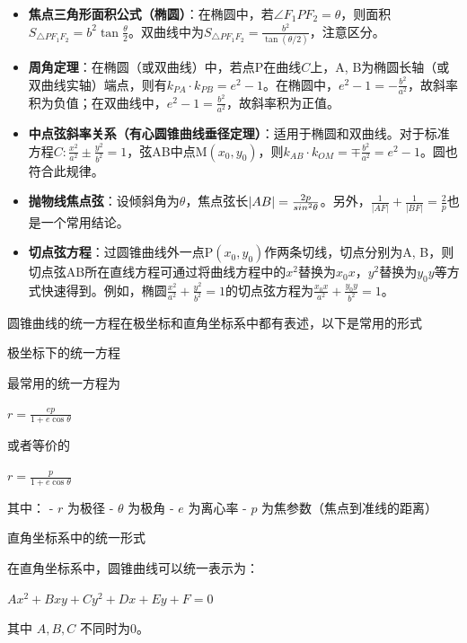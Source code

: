 \documentclass{article}
\begin{document}
	\begin{itemize}
		\item \textbf{焦点三角形面积公式（椭圆）}：在椭圆中，若$\angle F_1PF_2 = \theta$，则面积$S_{\triangle PF_1F_2} = b^2 \tan \frac{\theta}{2}$。双曲线中为$S_{\triangle PF_1F_2} = \frac{b^2}{\tan(\theta/2)}$，注意区分。
		
		\item \textbf{周角定理}：在椭圆（或双曲线）中，若点P在曲线$C$上，A, B为椭圆长轴（或双曲线实轴）端点，则有$k_{PA} \cdot k_{PB} = e^2 - 1$。在椭圆中，$e^2 - 1 = -\frac{b^2}{a^2}$，故斜率积为负值；在双曲线中，$e^2 - 1 = \frac{b^2}{a^2}$，故斜率积为正值。
		
		\item \textbf{中点弦斜率关系（有心圆锥曲线垂径定理）}：适用于椭圆和双曲线。对于标准方程$C: \frac{x^2}{a^2} \pm \frac{y^2}{b^2} = 1$，弦AB中点M$(x_0, y_0)$，则$k_{AB} \cdot k_{OM} = \mp \frac{b^2}{a^2} = e^2 - 1$。圆也符合此规律。
		
		\item \textbf{抛物线焦点弦}：设倾斜角为$\theta$，焦点弦长$|AB| = \frac{2p}{\\sin^2 \theta}$。另外，$\frac{1}{|AF|} + \frac{1}{|BF|} = \frac{2}{p}$也是一个常用结论。
		
		\item \textbf{切点弦方程}：过圆锥曲线外一点P$(x_0, y_0)$作两条切线，切点分别为A, B，则切点弦AB所在直线方程可通过将曲线方程中的$x^2$替换为$x_0x$，$y^2$替换为$y_0y$等方式快速得到。例如，椭圆$\frac{x^2}{a^2} + \frac{y^2}{b^2} = 1$的切点弦方程为$\frac{x_0 x}{a^2} + \frac{y_0 y}{b^2} = 1$。
	\end{itemize}
	

   圆锥曲线的统一方程在极坐标和直角坐标系中都有表述，以下是常用的形式
   
    极坐标下的统一方程
   
   最常用的统一方程为
   
  
   $ r = \frac{ep}{1 + e\cos\theta}$
   
   
   或者等价的
   
   $r = \frac{p}{1 + e\cos\theta} $
   
   其中：
   - $r$ 为极径
   - $\theta$ 为极角
   - $e$ 为离心率
   - $p$ 为焦参数（焦点到准线的距离）
   
    直角坐标系中的统一形式
   
   在直角坐标系中，圆锥曲线可以统一表示为：
   
   
   $Ax^2 + Bxy + Cy^2 + Dx + Ey + F = 0$
   
   
   其中 $A, B, C$ 不同时为0。
   
\end{document}
